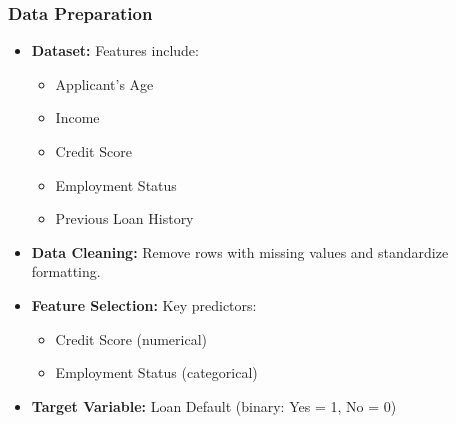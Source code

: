 \documentclass[aspectratio=169]{beamer}
\begin{document}
\begin{frame}[fragile]
    \frametitle{Data Preparation}
    \begin{itemize}
        \item \textbf{Dataset:} Features include:
        \begin{itemize}
            \item Applicant's Age
            \item Income
            \item Credit Score
            \item Employment Status
            \item Previous Loan History
        \end{itemize}
        
        \item \textbf{Data Cleaning:} Remove rows with missing values and standardize formatting.

        \item \textbf{Feature Selection:} Key predictors:
        \begin{itemize}
            \item Credit Score (numerical)
            \item Employment Status (categorical)
        \end{itemize}

        \item \textbf{Target Variable:} Loan Default (binary: Yes = 1, No = 0)
    \end{itemize}
\end{frame}
\end{document}
